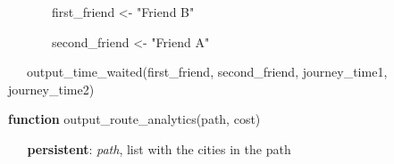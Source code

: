 \documentclass[12pt]{article}
\begin{document}
\begin{adjustwidth}{0.5in}{0.0in}
\begin{justify}
{\fontsize{8pt}{9.6pt}\selectfont \ \ \ \ \ \ \  first\_friend <- "Friend B"\par}
\end{justify}\par

\end{adjustwidth}

\begin{adjustwidth}{0.5in}{0.0in}
\begin{justify}
{\fontsize{8pt}{9.6pt}\selectfont \ \ \ \ \ \ \  second\_friend <- "Friend A"\par}
\end{justify}\par

\end{adjustwidth}

\begin{adjustwidth}{0.5in}{0.0in}
\begin{justify}
{\fontsize{8pt}{9.6pt}\selectfont \ \ \  output\_time\_waited(first\_friend, second\_friend, journey\_time1, journey\_time2)\par}
\end{justify}\par

\end{adjustwidth}


\vspace{\baselineskip}
\vspace{\baselineskip}\begin{adjustwidth}{0.5in}{0.0in}
\begin{justify}
{\fontsize{8pt}{9.6pt}\selectfont \textbf{function }output\_route\_analytics(path, cost)\par}
\end{justify}\par

\end{adjustwidth}

\begin{justify}
{\fontsize{8pt}{9.6pt}\selectfont \textbf{\ \   \tabto{0.75in} persistent}:\textit{ path}, list with the cities in the path\par}
\end{justify}\par

\begin{adjustwidth}{0.5in}{0.0in}
\begin{justify}
 \tabto{0.75in} \tab {}
\end{justify}\par

\end{adjustwidth}
\end{document}

